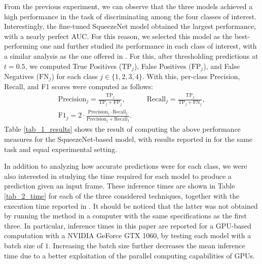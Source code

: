 From the previous experiment, we can observe that the three models achieved a high performance in the task of discriminating among the four classes of interest. Interestingly, the fine-tuned SqueezeNet model obtained the largest performance, with a nearly perfect AUC. For this reason, we selected this model as the best-performing one and further studied its performance in each class of interest, with a similar analysis as the one offered in \cite{moccia_learning-based_2018}. For this, after thresholding predictions at $t=0.5$, we computed True Positives ($\textrm{TP}_j$), False Positives ($\textrm{FP}_j$), and False Negatives ($\textrm{FN}_j$) for each class $j\in\{1,2,3,4\}$. With this, per-class Precision, Recall, and F1 scores were computed as follows:
\begin{gather*} 
\textrm{Precision}_j = \frac{\displaystyle \textrm{TP}_j}{\textrm{TP}_j+\textrm{FP}_j} ,
\quad \quad \quad 
\textrm{Recall}_j = \frac{\displaystyle \textrm{TP}_j}{\displaystyle \textrm{TP}_j+\textrm{FN}_j},
\\
\textrm{F1}_j = 2\cdot
\frac{\displaystyle \textrm{Precision}_j\cdot \textrm{Recall}_j}
{\displaystyle\textrm{Precision}_j + \textrm{Recall}_j}.
\end{gather*}
Table \ref{tab_1_results} shows the result of computing the above performance measures for the SqueezeNet-based model, with results reported in \cite{moccia_learning-based_2018} for the same task and equal experimental setting.



In addition to analyzing how accurate predictions were for each class, we were also interested in studying the time required for each model to produce a prediction given an input frame. 
These inference times are shown in Table \ref{tab_2_time} for each of the three considered techniques, together with the execution time reported in \cite{moccia_learning-based_2018}. 
It should be noticed that the latter was not obtained by running the method in a computer with the same specifications as the first three. 
In particular, inference times in this paper are reported for a GPU-based computation with a NVIDIA GeForce GTX 1060, by testing each model with a batch size of $1$.
Increasing the batch size further decreases the mean inference time due to a better exploitation of the parallel computing capabilities of GPUs.








